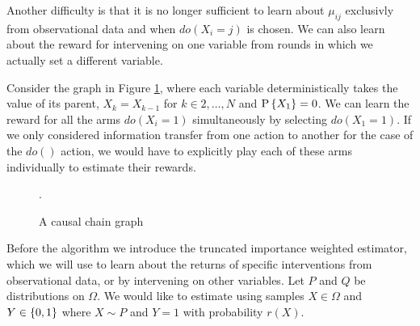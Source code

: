 Another difficulty is that it is no longer sufficient to learn about $\mu_{ij}$ exclusivly from observational data and when $do(X_i = j)$ is chosen.
We can also learn about the reward for intervening on one variable from rounds in which we actually set a different variable.


Consider the graph in Figure \ref{fig:causalchain}, where each variable deterministically takes the value of its parent, $X_k = X_{k-1}$ 
for $k\in {2,\ldots,N}$ and $\P{X_1} = 0$. 
We can learn the reward for all the arms $do(X_i = 1)$ simultaneously by selecting $do(X_1 = 1)$. 
If we only considered information transfer from one action to another for the case of the $do()$ action, we would have to 
explicitly play each of these arms individually to estimate their rewards. 

\begin{figure}[h]
\centering
\caption{A causal chain graph}.
\label{fig:causalchain}
\end{figure} 



Before the algorithm we introduce the truncated importance weighted estimator, which we will use to learn about the returns of 
specific interventions from observational data, or by intervening on other variables. Let $P$ and $Q$ be distributions on $\Omega$.
We would like to estimate
using samples $X \in \Omega$ and $Y \in \set{0,1}$ where $X \sim P$ and $Y = 1$ with probability $r(X)$.


